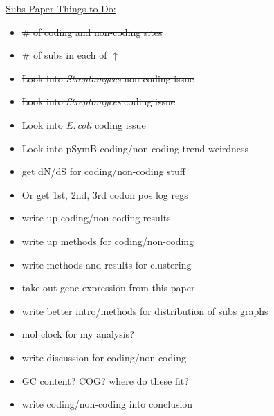 \documentclass[12pt]{article}
\newcommand{\strep}{\textit{Streptomyces}\xspace}
\newcommand{\ecol}{\textit{E.\,coli}\xspace}
\newcommand{\pb}{pSymB\xspace}
\begin{document}
\underline{Subs Paper Things to Do:}
\begin{itemize}
	\item \sout{ \# of coding and non-coding sites}
	
	\item \sout{\# of subs in each of $\uparrow$}
	
	\item \sout{Look into \strep non-coding issue}
	
	\item \sout{Look into \strep coding issue}
	
	\item Look into \ecol coding issue
	
	\item Look into \pb coding/non-coding trend weirdness
	
	\item get dN/dS for coding/non-coding stuff
	 
	\item Or get 1st, 2nd, 3rd codon pos log regs
	
	\item write up coding/non-coding results
	
	\item write up methods for coding/non-coding
	
	\item write methods and results for clustering
	
	\item take out gene expression from this paper
	
	\item write better intro/methods for distribution of subs graphs
	
	\item mol clock for my analysis?
	
	\item write discussion for coding/non-coding
	
	\item GC content? COG? where do these fit?
	
	\item write coding/non-coding into conclusion
	
\end{itemize}
\end{document}
